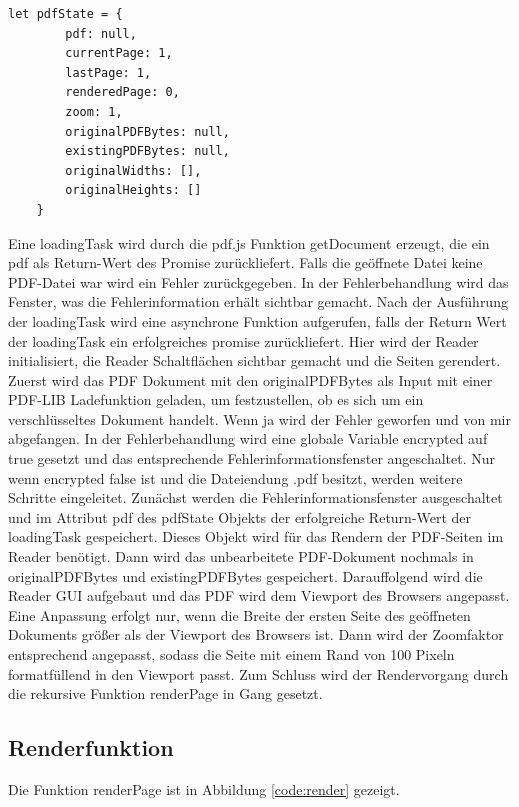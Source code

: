 \begin{lstlisting}[style=ES6, caption={Objekt für ein geöffnetes PDF-Dokument}, label=code:pdfstate]
	let pdfState = {
		pdf: null,
		currentPage: 1,
		lastPage: 1,
		renderedPage: 0,
		zoom: 1,
		originalPDFBytes: null,
		existingPDFBytes: null,
		originalWidths: [],
		originalHeights: []
	}
\end{lstlisting} 

Eine loadingTask wird durch die pdf.js Funktion getDocument erzeugt, die ein pdf als Return-Wert des Promise zurückliefert. Falls die geöffnete Datei keine PDF-Datei war wird ein Fehler zurückgegeben. In der Fehlerbehandlung wird das Fenster, was die Fehlerinformation erhält sichtbar gemacht. Nach der Ausführung der loadingTask wird eine asynchrone Funktion aufgerufen, falls der Return Wert der loadingTask ein erfolgreiches promise zurückliefert. Hier wird der Reader initialisiert, die Reader Schaltflächen sichtbar gemacht und die Seiten gerendert. Zuerst wird das PDF Dokument mit den originalPDFBytes als Input mit einer PDF-LIB Ladefunktion geladen, um festzustellen, ob es sich um ein verschlüsseltes Dokument handelt. Wenn ja wird der Fehler geworfen und von mir abgefangen. In der Fehlerbehandlung wird eine globale Variable encrypted auf true gesetzt und das entsprechende Fehlerinformationsfenster angeschaltet. Nur wenn encrypted false ist und die Dateiendung .pdf besitzt, werden weitere Schritte eingeleitet. Zunächst werden die Fehlerinformationsfenster ausgeschaltet und im Attribut pdf des pdfState Objekts der erfolgreiche Return-Wert der loadingTask gespeichert. Dieses Objekt wird für das Rendern der PDF-Seiten im Reader benötigt. Dann wird das unbearbeitete PDF-Dokument nochmals in originalPDFBytes und existingPDFBytes gespeichert. Darauffolgend wird die Reader GUI aufgebaut und das PDF wird dem Viewport des Browsers angepasst. Eine Anpassung erfolgt nur, wenn die Breite der ersten Seite des geöffneten Dokuments größer als der Viewport des Browsers ist. Dann wird der Zoomfaktor entsprechend angepasst, sodass die Seite mit einem Rand von 100 Pixeln formatfüllend in den Viewport passt. Zum Schluss wird der Rendervorgang durch die rekursive Funktion renderPage in Gang gesetzt.

\subsection{Renderfunktion}
Die Funktion renderPage ist in Abbildung \ref{code:render} gezeigt.

